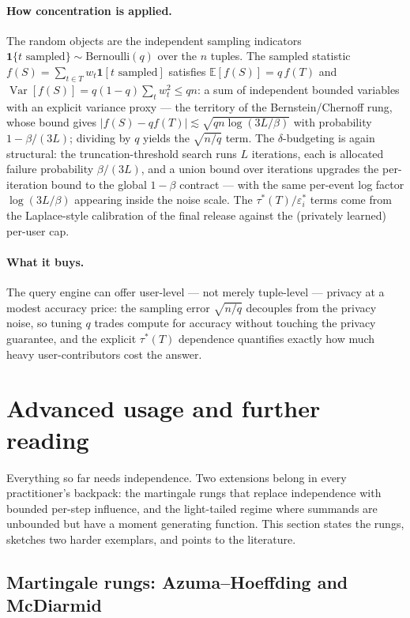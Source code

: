 \paragraph{How concentration is applied.}
The random objects are the independent sampling indicators
$\mathbf{1}\{t \text{ sampled}\} \sim \mathrm{Bernoulli}(q)$ over the $n$ tuples. The
sampled statistic $f(S) = \sum_{t \in T} w_t \mathbf{1}[t \text{ sampled}]$ satisfies
$\mathbb{E}[f(S)] = q\,f(T)$ and
$\operatorname{Var}[f(S)] = q(1-q)\sum_t w_t^2 \le qn$: a sum of independent bounded
variables with an explicit variance proxy --- the territory of the Bernstein/Chernoff
rung, whose bound gives $|f(S) - qf(T)| \lesssim \sqrt{qn \log(3L/\beta)}$ with
probability $1 - \beta/(3L)$; dividing by $q$ yields the $\sqrt{n/q}$ term. The
$\delta$-budgeting is again structural: the truncation-threshold search runs $L$
iterations, each is allocated failure probability $\beta/(3L)$, and a union bound over
iterations upgrades the per-iteration bound to the global $1-\beta$ contract --- with the
same per-event log factor $\log(3L/\beta)$ appearing inside the noise scale. The
$\tau^*(T)/\varepsilon_i^*$ terms come from the Laplace-style calibration of the final
release against the (privately learned) per-user cap.

\paragraph{What it buys.}
The query engine can offer user-level --- not merely tuple-level --- privacy at a
modest accuracy price: the sampling error $\sqrt{n/q}$ decouples from the privacy noise,
so tuning $q$ trades compute for accuracy without touching the privacy guarantee, and
the explicit $\tau^*(T)$ dependence quantifies exactly how much heavy user-contributors
cost the answer.

\section{Advanced usage and further reading}
\label{sec:conc-advanced}

Everything so far needs independence. Two extensions belong in every practitioner's
backpack: the martingale rungs that replace independence with bounded per-step
influence, and the light-tailed regime where summands are unbounded but have a moment
generating function. This section states the rungs, sketches two harder exemplars, and
points to the literature.

\subsection{Martingale rungs: Azuma--Hoeffding and McDiarmid}
\label{sec:conc-martingales}


